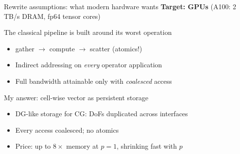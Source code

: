 \documentclass{beamer}
\begin{document}
\begin{frame}{Rewrite assumptions: what modern hardware wants}
    \textbf{Target: GPUs} (A100: 2\,TB/s DRAM, fp64 tensor cores)
    \vfill
    \begin{block}{The classical pipeline is built around its worst operation}
        \begin{itemize}
            \item gather $\to$ compute $\to$ scatter (atomics!)
            \item Indirect addressing on \emph{every} operator application
            \item Full bandwidth attainable \alert{only} with \emph{coalesced} access
        \end{itemize}
    \end{block}
    \vfill
    \pause
    \begin{block}{My answer: cell-wise vector as persistent storage}
        \begin{itemize}
            \item DG-like storage for CG: DoFs duplicated across interfaces
            \item Every access coalesced; no atomics
            \item Price: up to $8\times$ memory at $p=1$, shrinking fast with $p$
        \end{itemize}
    \end{block}
\end{frame}
\end{document}
